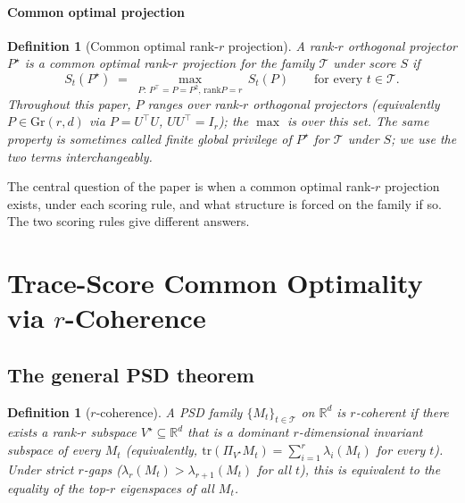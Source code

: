 \documentclass[final,3p,times]{elsarticle}
\newtheorem{definition}[theorem]{Definition}
\newcommand{\Gr}{\mathrm{Gr}}
\newcommand{\tr}{\mathrm{tr}}
\newcommand{\R}{\mathbb{R}}
\newcommand{\rank}{\mathrm{rank}}
\begin{document}
\paragraph{Common optimal projection}
\begin{definition}[Common optimal rank-$r$ projection]\label{def:fgp}
A rank-$r$ orthogonal projector $P^\star$ is a \emph{common optimal
rank-$r$ projection} for the family $\mathcal{T}$ under score $S$ if
\begin{equation}
  S_t(P^\star) \;=\; \max_{P:\,P^\top=P=P^2,\,\rank P=r}\,S_t(P)
  \qquad\text{for every }t\in\mathcal{T}.
\end{equation}
Throughout this paper, $P$ ranges over rank-$r$ orthogonal projectors
(equivalently $P\in\Gr(r,d)$ via $P=U^\top U$, $UU^\top=I_r$); the
$\max$ is over this set.
The same property is sometimes called \emph{finite global privilege} of
$P^\star$ for $\mathcal{T}$ under $S$; we use the two terms
interchangeably.
\end{definition}

The central question of the paper is when a common optimal rank-$r$
projection exists, under each scoring rule, and what structure is forced
on the family if so.
The two scoring rules give different answers.

\section{Trace-Score Common Optimality via \texorpdfstring{$r$}{r}-Coherence}
\label{sec:pred}

\subsection{The general PSD theorem}

\begin{definition}[$r$-coherence]\label{def:rcoh}
A PSD family $\{M_t\}_{t\in\mathcal{T}}$ on $\R^d$ is \emph{$r$-coherent}
if there exists a rank-$r$ subspace $V^\star\subseteq\R^d$ that is a
dominant $r$-dimensional invariant subspace of every $M_t$ (equivalently,
$\tr(\Pi_{V^\star}M_t)=\sum_{i=1}^r\lambda_i(M_t)$ for every $t$).
Under strict $r$-gaps ($\lambda_r(M_t)>\lambda_{r+1}(M_t)$ for all $t$),
this is equivalent to the equality of the top-$r$ eigenspaces of all
$M_t$.
\end{definition}
\end{document}

